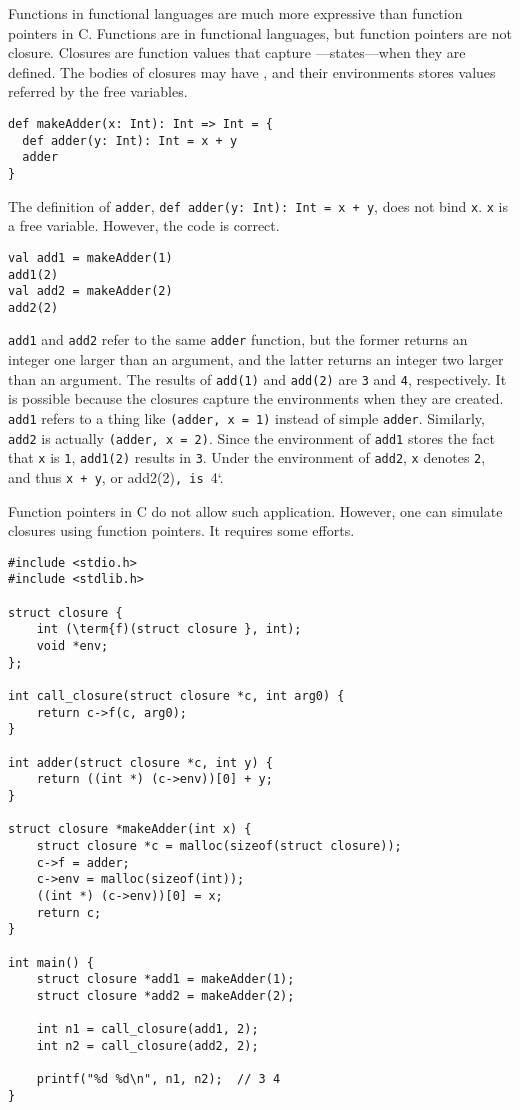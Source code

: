 Functions in functional languages are much more expressive than function pointers
in C. Functions are  in functional languages, but function
pointers are not closure. Closures are function values that capture
---states---when they are defined. The bodies of closures may
have , and their environments stores values referred by the
free variables.

\begin{verbatim}
def makeAdder(x: Int): Int => Int = {
  def adder(y: Int): Int = x + y
  adder
}
\end{verbatim}

The definition of \verb!adder!, \verb!def adder(y: Int): Int = x + y!, does not
bind \verb!x!. \verb!x! is a free variable. However, the code is correct.

\begin{verbatim}
val add1 = makeAdder(1)
add1(2)
val add2 = makeAdder(2)
add2(2)
\end{verbatim}

\verb!add1! and \verb!add2! refer to the same \verb!adder! function, but the
former returns an integer one larger than an argument, and the latter returns an
integer two larger than an argument. The results of \verb!add(1)! and
\verb!add(2)! are \verb!3! and \verb!4!, respectively. It is possible because the
closures capture the environments when they are created. \verb!add1! refers to a
thing like \verb!(adder, x = 1)! instead of simple \verb!adder!. Similarly,
\verb!add2! is actually \verb!(adder, x = 2)!. Since the environment of
\verb!add1! stores the fact that \verb!x! is \verb!1!, \verb!add1(2)! results in
\verb!3!. Under the environment of \verb!add2!, \verb!x! denotes \verb!2!, and
thus \verb!x + y!, or add2(2)\verb!, is !4`.

Function pointers in C do not allow such application. However, one can simulate
closures using function pointers. It requires some efforts.

\begin{verbatim}
#include <stdio.h>
#include <stdlib.h>

struct closure {
    int (\term{f)(struct closure }, int);
    void *env;
};

int call_closure(struct closure *c, int arg0) {
    return c->f(c, arg0);
}

int adder(struct closure *c, int y) {
    return ((int *) (c->env))[0] + y;
}

struct closure *makeAdder(int x) {
    struct closure *c = malloc(sizeof(struct closure));
    c->f = adder;
    c->env = malloc(sizeof(int));
    ((int *) (c->env))[0] = x;
    return c;
}

int main() {
    struct closure *add1 = makeAdder(1);
    struct closure *add2 = makeAdder(2);

    int n1 = call_closure(add1, 2);
    int n2 = call_closure(add2, 2);

    printf("%d %d\n", n1, n2);  // 3 4
}
\end{verbatim}

